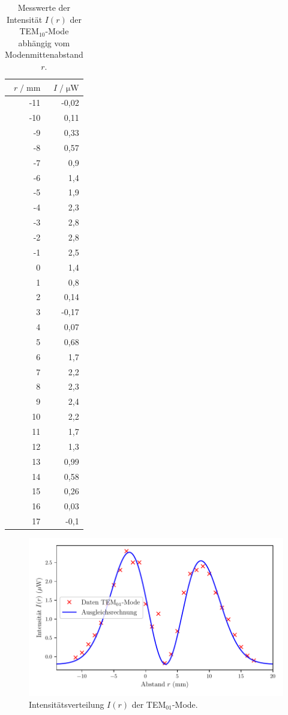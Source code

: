 \begin{table}[H]
  \centering
  \footnotesize
  \caption{Messwerte der Intensität $I(r)$ der TEM$_{10}$-Mode abhängig vom Modenmittenabstand $r$.}
  \label{tab:TEM10}
  \begin{tabular}{r r}
  \toprule
  $r \;/\; \si{\milli\meter}$ & $I \;/\; \si{\micro\watt}$ \\
  \midrule
    -11 & -0,02 \\
    -10 & 0,11  \\
    -9  & 0,33  \\
    -8  & 0,57  \\
    -7  & 0,9   \\
    -6  & 1,4   \\
    -5  & 1,9   \\
    -4  & 2,3   \\
    -3  & 2,8   \\
    -2  & 2,8   \\
    -1  & 2,5   \\
    0   & 1,4   \\
    1   & 0,8   \\
    2   & 0,14  \\
    3   & -0,17 \\
    4   & 0,07  \\
    5   & 0,68  \\
    6   & 1,7   \\
    7   & 2,2   \\
    8   & 2,3   \\
    9   & 2,4   \\
    10  & 2,2   \\
    11  & 1,7   \\
    12  & 1,3   \\
    13  & 0,99  \\
    14  & 0,58  \\
    15  & 0,26  \\
    16  & 0,03  \\
    17  & -0,1  \\
  \bottomrule
  \end{tabular}
\end{table}


\begin{figure}[H]
  \centering
  \includegraphics[scale=0.65]{TEM01.pdf}
  \vspace{-10pt}
  \caption{Intensitätsverteilung $I(r)$ der TEM$_{01}$-Mode.}
  \label{fig:TEM01}
\end{figure}


